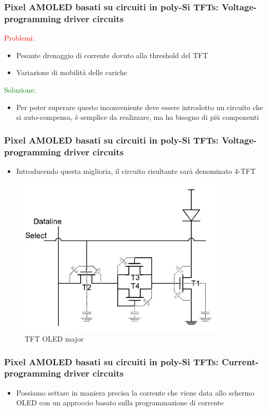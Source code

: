 \documentclass[12pt]{beamer}
\begin{document}
	\begin{frame}
		\frametitle{Pixel AMOLED basati su circuiti in poly-Si TFTs: Voltage-programming driver circuits}
		\textcolor{red}{Problemi:}
		\begin{itemize}
			\item Pesante drenaggio di corrente dovuto alla threshold del TFT
			\item Variazione di mobilità delle cariche
		\end{itemize}
		\pause
		\textcolor{green}{Soluzione:}
		\pause
		\begin{itemize}
			\item Per poter superare questo inconveniente deve essere introdotto un circuito che si auto-compensa, è semplice da realizzare, ma ha bisogno di più componenti
		\end{itemize}
	\end{frame}
	\begin{frame}
		\frametitle{Pixel AMOLED basati su circuiti in poly-Si TFTs: Voltage-programming driver circuits}
		\begin{itemize}
			\item Introducendo questa miglioria, il circuito risultante sarà denominato 4-TFT
		\end{itemize}
		\begin{figure}
			\centering
			\includegraphics[width=0.7\linewidth]{FISICA/tft_oled_maggiore}
			\caption{TFT OLED major}
			\label{fig:tftoledmaggiore}
		\end{figure}
	\end{frame}
	\begin{frame}
		\frametitle{Pixel AMOLED basati su circuiti in poly-Si TFTs: Current-programming driver circuits}
		\begin{itemize}
			\item Possiamo settare in maniera precisa la corrente che viene data allo schermo OLED con un approccio basato sulla programmazione di corrente
		\end{itemize}
	\end{frame}
\end{document}
